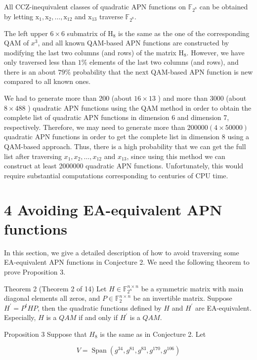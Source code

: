 \documentclass[10pt]{article}
\begin{document}
All CCZ-inequivalent classes of quadratic APN functions on $\mathbb{F}_{2^{8}}$ can be obtained by letting $\mathrm{x}_{1}, \mathrm{x}_{2}, \ldots, \mathrm{x}_{12}$ and $\mathrm{x}_{13}$ traverse $\mathbb{F}_{2^{8}}$.

The left upper $6 \times 6$ submatrix of $\mathrm{H}_{8}$ is the same as the one of the corresponding QAM of $x^{3}$, and all known QAM-based APN functions are constructed by modifying the last two columns (and rows) of the matrix $\mathrm{H}_{8}$. However, we have only traversed less than $1 \%$ elements of the last two columns (and rows), and there is an about $79 \%$ probability that the next QAM-based APN function is new compared to all known ones.

We had to generate more than 200 (about $16 \times 13$ ) and more than 3000 (about $8 \times 488$ ) quadratic APN functions using the QAM method in order to obtain the complete list of quadratic APN functions in dimension 6 and dimension 7, respectively. Therefore, we may need to generate more than $200000(4 \times 50000)$ quadratic APN functions in order to get the complete list in dimension 8 using a QAM-based approach. Thus, there is a high probability that we can get the full list after traversing $x_{1}, x_{2}, \ldots, x_{12}$ and $x_{13}$, since using this method we can construct at least 2000000 quadratic APN functions. Unfortunately, this would require substantial computations corresponding to centuries of CPU time.

\section*{4 Avoiding EA-equivalent APN functions}
In this section, we give a detailed description of how to avoid traversing some EA-equivalent APN functions in Conjecture 2. We need the following theorem to prove Proposition 3.

Theorem 2 (Theorem 2 of 14) Let $H \in \mathbb{F}_{2^{n}}^{n \times n}$ be a symmetric matrix with main diagonal elements all zeros, and $P \in \mathbb{F}_{2}^{n \times n}$ be an invertible matrix. Suppose $H^{\prime}=P^{t} H P$, then the quadratic functions defined by $H$ and $H^{\prime}$ are EA-equivalent. Especially, $H$ is a $Q A M$ if and only if $H^{\prime}$ is a $Q A M$.

Proposition 3 Suppose that $H_{8}$ is the same as in Conjecture 2. Let

$$
V=\operatorname{Span}\left(g^{34}, g^{81}, g^{83}, g^{170}, g^{106}\right)
$$
\end{document}
